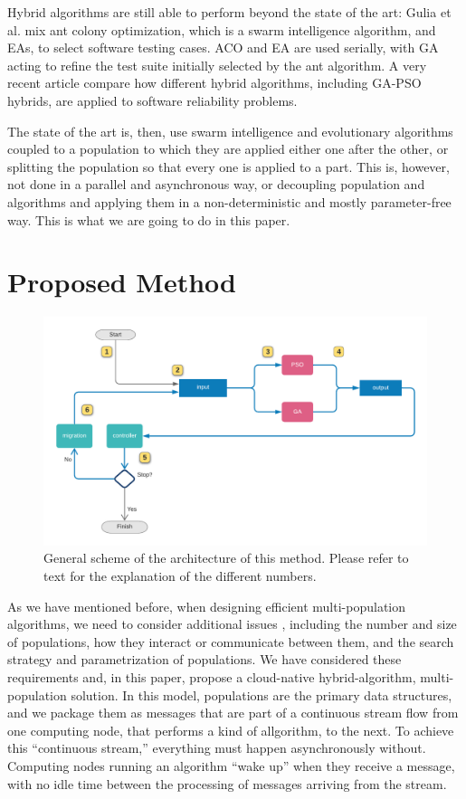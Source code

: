 \documentclass[runningheads]{llncs}
\begin{document}
Hybrid algorithms are still able to perform beyond the state of the
art: Gulia et al. \cite{gulia2019hybrid} mix ant colony optimization,
which is a swarm intelligence algorithm, and EAs, to select
software testing cases. ACO and EA are used serially, with GA acting
to refine the test suite initially selected by the ant algorithm. A
very recent article \cite{sangeeta2020comprehensive} compare how
different hybrid algorithms, including GA-PSO hybrids, are applied to
software reliability problems.

The state of the art is, then, use swarm intelligence and evolutionary
algorithms coupled to a population to which they are applied either
one after the other, or splitting the population so that every one is
applied to a part. This is, however, not done in a parallel and
asynchronous way, or decoupling population and algorithms and applying
them in a non-deterministic and mostly parameter-free way. This is
what we are going to do in this paper.

\section{Proposed Method}
\label{method}
%
\begin{figure}[h!tb]
\includegraphics[width=5in]{../images/kafkeo}
\caption{General scheme of the architecture of this method. Please
  refer to text for the explanation of the different numbers.}
\label{fig:kafkeo}
\end{figure}

As we have mentioned before, when designing efficient multi-population
algorithms, we need to consider additional issues \cite{Ma2019},
including the number and size of populations, how they interact or
communicate between them, and the search strategy and parametrization
of populations. We have considered these requirements and, in this
paper, propose a cloud-native hybrid-algorithm, multi-population
solution. In this model, populations are the primary data structures,
and we package them as messages that are part of a continuous stream
flow from one computing node, that performs a kind of allgorithm, to
the next. To achieve this ``continuous stream,'' everything must
happen asynchronously without. Computing nodes running an algorithm
``wake up'' when they receive a message, with no idle time between the
processing of messages arriving from the stream.
\end{document}
